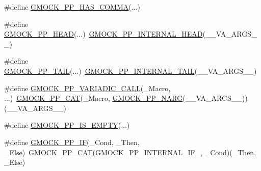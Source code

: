 \begin{DoxyCompactItemize}
\#define \mbox{\hyperlink{_obj__test_2lib_2googletest-master_2googlemock_2include_2gmock_2internal_2gmock-pp_8h_aaf83e01e56eb26d7eac9efb477587510}{G\+M\+O\+C\+K\+\_\+\+P\+P\+\_\+\+H\+A\+S\+\_\+\+C\+O\+M\+MA}}(...)
\item 
\#define \mbox{\hyperlink{_obj__test_2lib_2googletest-master_2googlemock_2include_2gmock_2internal_2gmock-pp_8h_ad7910160dfc0fb20b239efcf1f3ddd85}{G\+M\+O\+C\+K\+\_\+\+P\+P\+\_\+\+H\+E\+AD}}(...)~\mbox{\hyperlink{_obj__test_2lib_2googletest-master_2googlemock_2include_2gmock_2internal_2gmock-pp_8h_a76a2c212a600bad8c26c34343785d070}{G\+M\+O\+C\+K\+\_\+\+P\+P\+\_\+\+I\+N\+T\+E\+R\+N\+A\+L\+\_\+\+H\+E\+AD}}(\+\_\+\+\_\+\+V\+A\+\_\+\+A\+R\+G\+S\+\_\+\+\_\+)
\item 
\#define \mbox{\hyperlink{_obj__test_2lib_2googletest-master_2googlemock_2include_2gmock_2internal_2gmock-pp_8h_a1373615930e6eb6772c914fa8416f88e}{G\+M\+O\+C\+K\+\_\+\+P\+P\+\_\+\+T\+A\+IL}}(...)~\mbox{\hyperlink{_obj__test_2lib_2googletest-master_2googlemock_2include_2gmock_2internal_2gmock-pp_8h_a0e7741e9333e33780a56a8c5e2079942}{G\+M\+O\+C\+K\+\_\+\+P\+P\+\_\+\+I\+N\+T\+E\+R\+N\+A\+L\+\_\+\+T\+A\+IL}}(\+\_\+\+\_\+\+V\+A\+\_\+\+A\+R\+G\+S\+\_\+\+\_\+)
\item 
\#define \mbox{\hyperlink{_obj__test_2lib_2googletest-master_2googlemock_2include_2gmock_2internal_2gmock-pp_8h_a4dd8715f753c7c3957f7185acf609e55}{G\+M\+O\+C\+K\+\_\+\+P\+P\+\_\+\+V\+A\+R\+I\+A\+D\+I\+C\+\_\+\+C\+A\+LL}}(\+\_\+\+Macro, ...)~\mbox{\hyperlink{_obj__test_2lib_2googletest-master_2googlemock_2include_2gmock_2internal_2gmock-pp_8h_a108c52ffa81ab99348d23b8fa76fded3}{G\+M\+O\+C\+K\+\_\+\+P\+P\+\_\+\+C\+AT}}(\+\_\+\+Macro, \mbox{\hyperlink{_obj__test_2lib_2googletest-master_2googlemock_2include_2gmock_2internal_2gmock-pp_8h_a9db18220b88597a07704bc7cf3b13304}{G\+M\+O\+C\+K\+\_\+\+P\+P\+\_\+\+N\+A\+RG}}(\+\_\+\+\_\+\+V\+A\+\_\+\+A\+R\+G\+S\+\_\+\+\_\+))(\+\_\+\+\_\+\+V\+A\+\_\+\+A\+R\+G\+S\+\_\+\+\_\+)
\item 
\#define \mbox{\hyperlink{_obj__test_2lib_2googletest-master_2googlemock_2include_2gmock_2internal_2gmock-pp_8h_a14eb10c5cc7380d072cd748661140f45}{G\+M\+O\+C\+K\+\_\+\+P\+P\+\_\+\+I\+S\+\_\+\+E\+M\+P\+TY}}(...)
\item 
\#define \mbox{\hyperlink{_obj__test_2lib_2googletest-master_2googlemock_2include_2gmock_2internal_2gmock-pp_8h_a82f153fedbaf56bf71b8272bdf672875}{G\+M\+O\+C\+K\+\_\+\+P\+P\+\_\+\+IF}}(\+\_\+\+Cond,  \+\_\+\+Then,  \+\_\+\+Else)~\mbox{\hyperlink{_obj__test_2lib_2googletest-master_2googlemock_2include_2gmock_2internal_2gmock-pp_8h_a108c52ffa81ab99348d23b8fa76fded3}{G\+M\+O\+C\+K\+\_\+\+P\+P\+\_\+\+C\+AT}}(G\+M\+O\+C\+K\+\_\+\+P\+P\+\_\+\+I\+N\+T\+E\+R\+N\+A\+L\+\_\+\+I\+F\+\_\+, \+\_\+\+Cond)(\+\_\+\+Then, \+\_\+\+Else)

\end{DoxyCompactItemize}
